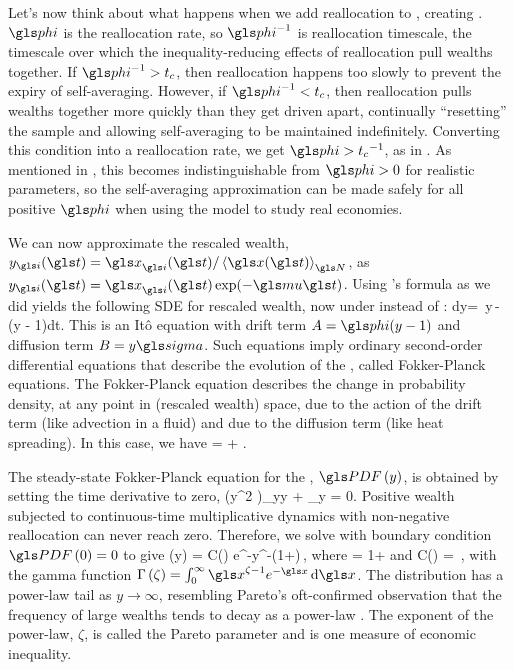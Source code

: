 Let's now think about what happens when we add reallocation to \GBM, creating \RGBM. $\gphi$ is the reallocation rate, so $\gphi^{-1}$ is reallocation timescale, \ie the timescale over which the inequality-reducing effects of reallocation pull wealths together. If $\gphi^{-1}>t_c$, then reallocation happens too slowly to prevent the expiry of self-averaging. However, if $\gphi^{-1}<t_c$, then reallocation pulls wealths together more quickly than they get driven apart, continually ``resetting'' the sample and allowing self-averaging to be maintained indefinitely. Converting this condition into a reallocation rate, we get $\gphi>{t_c}^{-1}$, as in . As mentioned in , this becomes indistinguishable from $\gphi>0$ for realistic parameters, so the self-averaging approximation can be made safely for all positive $\gphi$ when using the model to study real economies.

We can now approximate the rescaled wealth, $y_\gi(\t)=\x_\gi(\t)/\ave{\x(\t)}_\N$, as $y_\gi(\t)=\x_\gi(\t)\exp(-\gmu \t)$. Using \Ito's formula as we did  yields the following SDE for rescaled wealth, now under \RGBM instead of \GBM:
\be
dy= \gsigma\,y\,\gd\gW - \gphi\left(y - 1\right)dt.
\ee
This is an It\^o equation with drift term $A=\gphi(y - 1)$ and diffusion term $B=y \gsigma$. Such equations imply ordinary second-order differential equations that describe the evolution of the \PDFa, called Fokker-Planck equations. The Fokker-Planck equation describes the change in probability density, at any point in (rescaled wealth) space, due to the action of the drift term (like advection in a fluid) and due to the diffusion term (like heat spreading). In this case, we have
\be
{}= + .
\ee

The steady-state Fokker-Planck equation for the \PDFa, $\PDF\left(y\right)$, is obtained by setting the time derivative to zero,
\be
{}\left(y^2 \PDF\right)_{yy} + \gphi{}_y = 0.
\ee
Positive wealth subjected to continuous-time multiplicative dynamics with non-negative reallocation can never reach zero. Therefore, we solve  with boundary condition $\PDF\left(0\right)=0$ to give
\be
\PDF\left(y\right) = C\left(\zeta\right) e^{-}y^{-\left(1+\zeta\right)}\,,
\ee
where 
\be
\zeta = 1+
\ee
and
\be
C\left(\zeta\right) = \frac{\left(\zeta -1\right)^\zeta}{\Gamma \left(\zeta \right)}\,,
\ee
with the gamma function $\Gamma\left(\zeta\right) = \int_0^\infty \x^{\zeta-1} e^{-\x}\,\mathrm{d}\x$. The distribution has a power-law tail as $y\to\infty$, resembling Pareto's oft-confirmed observation that the frequency of large wealths tends to decay as a power-law \cite{Pareto1897}. The exponent of the power-law, $\zeta$, is called the Pareto parameter and is one measure of economic inequality.


